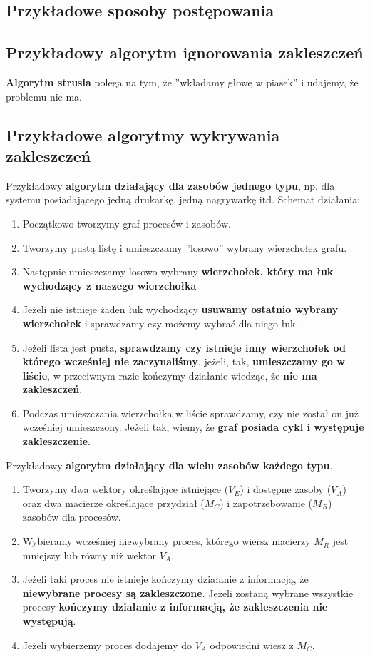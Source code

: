 \documentclass{article}
\begin{document}
\subsection{Przykładowe sposoby postępowania}
\subsection*{Przykładowy algorytm ignorowania zakleszczeń}
\textbf{Algorytm strusia} polega na tym, że ”wkładamy głowę w piasek” i udajemy, że problemu nie ma.

\subsection*{Przykładowe algorytmy wykrywania zakleszczeń}
Przykładowy \textbf{algorytm działający dla zasobów jednego typu}, np. dla systemu posiadającego jedną drukarkę, jedną nagrywarkę itd. Schemat działania:
\begin{enumerate}
    \item Początkowo tworzymy graf procesów i zasobów.
    \item Tworzymy pustą listę i umieszczamy ”losowo” wybrany wierzchołek grafu.
    \item Następnie umieszczamy losowo wybrany \textbf{wierzchołek, który ma łuk wychodzący z naszego wierzchołka}
    \item Jeżeli nie istnieje żaden łuk wychodzący \textbf{usuwamy ostatnio wybrany wierzchołek} i sprawdzamy czy możemy wybrać dla niego łuk.
    \item Jeżeli lista jest pusta, \textbf{sprawdzamy czy istnieje inny wierzchołek od którego wcześniej nie zaczynaliśmy}, jeżeli, tak, \textbf{umieszczamy go w liście}, w przeciwnym razie kończymy działanie wiedząc, że \textbf{nie ma zakleszczeń}.
    \item Podczas umieszczania wierzchołka w liście sprawdzamy, czy nie został on już wcześniej umieszczony. Jeżeli tak, wiemy, że \textbf{graf posiada cykl i występuje zakleszczenie}.
\end{enumerate}

Przykładowy \textbf{algorytm działający dla wielu zasobów każdego typu}.
\begin{enumerate}
    \item Tworzymy dwa wektory określające istniejące ($V_E$) i dostępne zasoby ($V_A$) oraz dwa macierze określające przydział ($M_C$) i zapotrzebowanie ($M_R$) zasobów dla procesów.
    \item Wybieramy wcześniej niewybrany proces, którego wiersz macierzy $M_R$ jest mniejszy lub równy niż wektor $V_A$.
    \item Jeżeli taki proces nie istnieje kończymy działanie z informacją, że \textbf{niewybrane procesy są zakleszczone}. Jeżeli zostaną wybrane wszystkie procesy \textbf{kończymy działanie z informacją, że zakleszczenia nie występują}.
    \item Jeżeli wybierzemy proces dodajemy do $V_A$ odpowiedni wiesz z $M_C$.
\end{enumerate}
\end{document}
